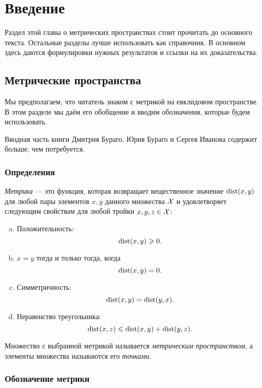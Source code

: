 \chapter*{Введение}

Раздел этой главы о метрических пространствах стоит прочитать до основного текста.
Остальные разделы лучше использовать как справочник.
В основном здесь даются формулировки нужных результатов и ссылки на их доказательства.

\section{Метрические пространства}\label{sec:metric-spcaes}

Мы предполагаем, что читатель знаком с метрикой на евклидовом пространстве. 
В этом разделе мы даём его обобщение и вводим обозначения, которые будем использовать.

Вводная часть книги Дмитрия Бураго, Юрия Бураго и Сергея Иванова \cite{burago-burago-ivanov} содержит больше, чем потребуется.

\subsection*{Определения}

\emph{Метрика} --- это функция, которая возвращает вещественное значение $\mathop{\rm dist}\nolimits(x,y)$ для любой пары элементов $x,y$ данного множества $\mathcal{X}$ и удовлетворяет следующим свойствам для любой тройки $x,y,z\in\mathcal{X}$: \label{page:def:metric}
\begin{enumerate}[(a)]
\item\label{def:metric-space:a}
Положительность: 
$$\mathop{\rm dist}\nolimits(x,y)\geqslant 0.$$
\item\label{def:metric-space:b}
$x=y$ тогда и только тогда, когда 
$$\mathop{\rm dist}\nolimits(x,y)=0.$$
\item\label{def:metric-space:c}
Симметричность: $$\mathop{\rm dist}\nolimits(x, y) = \mathop{\rm dist}\nolimits(y, x).$$
\item\label{def:metric-space:d}
Неравенство треугольника: 
$$\mathop{\rm dist}\nolimits(x, z) \leqslant \mathop{\rm dist}\nolimits(x, y) + \mathop{\rm dist}\nolimits(y, z).$$
\end{enumerate}

{\sloppy

Множество с выбранной метрикой называется \emph{метрическим пространством}, а элементы множества называются его \emph{точками}.

}

\subsection*{Обозначение метрики}

